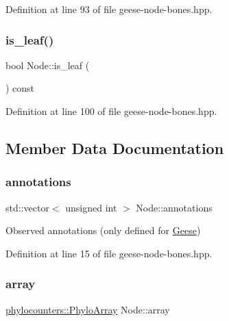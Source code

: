 Definition at line 93 of file geese-\/node-\/bones.\+hpp.

\mbox{\label{class_node_af7cc2d0f435e3bee4388a0e9ab42adb8}} 
\subsubsection{\texorpdfstring{is\+\_\+leaf()}{is\_leaf()}}
{\footnotesize\ttfamily bool Node\+::is\+\_\+leaf (\begin{DoxyParamCaption}{ }\end{DoxyParamCaption}) const\hspace{0.3cm}{\ttfamily [inline]}}



Definition at line 100 of file geese-\/node-\/bones.\+hpp.



\subsection{Member Data Documentation}
\mbox{\label{class_node_aea43a76094980788d1debd3e18ed8070}} 
\subsubsection{\texorpdfstring{annotations}{annotations}}
{\footnotesize\ttfamily std\+::vector$<$ unsigned int $>$ Node\+::annotations}



Observed annotations (only defined for \hyperlink{class_geese}{Geese}) 



Definition at line 15 of file geese-\/node-\/bones.\+hpp.

\mbox{\label{class_node_a86d6575dd1ad7ab0cb02c6e6202b0608}} 
\subsubsection{\texorpdfstring{array}{array}}
{\footnotesize\ttfamily \hyperlink{namespacebarry_1_1counters_1_1phylo_abd293bf65e494e903639fb5fb2c91604}{phylocounters\+::\+Phylo\+Array} Node\+::array}



